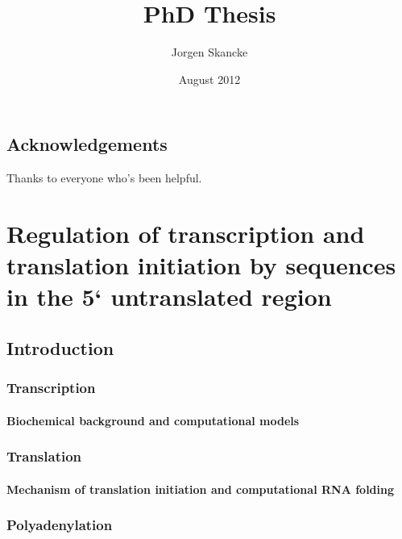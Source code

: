 \documentclass[b5paper]{report}
\title{PhD Thesis}
\author{Jorgen Skancke}
\date{August 2012}
\begin{document}
 

\chapter*{Acknowledgements}
Thanks to everyone who's been helpful.

\maketitle

\part{Regulation of transcription and translation initiation by sequences in
the 5` untranslated region}

\chapter{Introduction}



\section{Transcription}

\subsection{Biochemical background and computational models}



\section{Translation}

\subsection{Mechanism of translation initiation and computational RNA folding}

\section{Polyadenylation}

\end{document}
